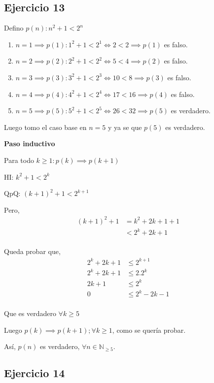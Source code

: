 \subsection{Ejercicio 13}

Defino $ p(n): n^2 +1 < 2^n$

\begin{enumerate}
    \item[] $ n= 1 \implies p(1): 1^2 + 1<2^1 \iff 2<2 \implies p(1)$ es falso.
    \item[] $ n= 2 \implies p(2): 2^2 + 1<2^2 \iff 5<4 \implies p(2)$ es falso.  
    \item[] $ n= 3 \implies p(3): 3^2 + 1<2^3 \iff 10<8 \implies p(3)$ es falso.
    \item[] $ n= 4 \implies p(4): 4^2 + 1<2^4 \iff 17<16 \implies p(4)$ es falso. 
    \item[] $ n= 5 \implies p(5): 5^2 + 1<2^5 \iff 26<32 \implies p(5)$ es verdadero. 
\end{enumerate}

Luego tomo el caso base en $ n = 5 $ y ya se que $p(5)$ es verdadero.

\textbf{Paso inductivo}

Para todo $k \geq 1: p(k) \implies p(k+1)$

HI: $k^2 +1 < 2^k$

QpQ: $ (k+1)^2 +1 < 2^{k+1}$

Pero,
\begin{align*}
    (k+1)^2 +1 &= k^2 + 2k + 1 + 1 \\
    &< 2^k + 2k + 1 \\
\end{align*}

Queda probar que,
\begin{align*}
    2^k + 2k + 1 &\leq 2^{k+1} \\
    2^k + 2k + 1 &\leq 2.2^k \\
    2k + 1 &\leq 2^k\\
    0 &\leq 2^k  - 2k - 1\\
\end{align*}

Que es verdadero $\forall k \geq 5$

Luego $p(k) \implies p(k+1); \forall k \geq 1$, como se quería probar.

Así, $p(n)$ es verdadero, $\forall n \in \mathbb{N}_{\geq 5}$.

\subsection{Ejercicio 14}

